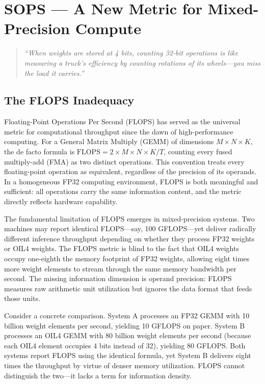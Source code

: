 
\chapter{SOPS --- A New Metric for Mixed-Precision Compute}
\label{ch:sops}

\begin{quote}
\textit{``When weights are stored at 4 bits, counting 32-bit operations is like measuring a truck's efficiency by counting rotations of its wheels---you miss the load it carries.''}
\end{quote}

\section{The FLOPS Inadequacy}
\label{sec:flops_inadequacy}

Floating-Point Operations Per Second (FLOPS) has served as the universal metric for computational throughput since the dawn of high-performance computing. For a General Matrix Multiply (GEMM) of dimensions $M \times N \times K$, the de facto formula is $\text{FLOPS} = 2 \times M \times N \times K / T$, counting every fused multiply-add (FMA) as two distinct operations. This convention treats every floating-point operation as equivalent, regardless of the precision of its operands. In a homogeneous FP32 computing environment, FLOPS is both meaningful and sufficient: all operations carry the same information content, and the metric directly reflects hardware capability.

The fundamental limitation of FLOPS emerges in mixed-precision systems. Two machines may report identical FLOPS---say, 100 GFLOPS---yet deliver radically different inference throughput depending on whether they process FP32 weights or OIL4 weights. The FLOPS metric is blind to the fact that OIL4 weights occupy one-eighth the memory footprint of FP32 weights, allowing eight times more weight elements to stream through the same memory bandwidth per second. The missing information dimension is operand precision: FLOPS measures raw arithmetic unit utilization but ignores the data format that feeds those units.

Consider a concrete comparison. System A processes an FP32 GEMM with 10 billion weight elements per second, yielding 10 GFLOPS on paper. System B processes an OIL4 GEMM with 80 billion weight elements per second (because each OIL4 element occupies 4 bits instead of 32), yielding 80 GFLOPS. Both systems report FLOPS using the identical formula, yet System B delivers eight times the throughput by virtue of denser memory utilization. FLOPS cannot distinguish the two---it lacks a term for information density.

